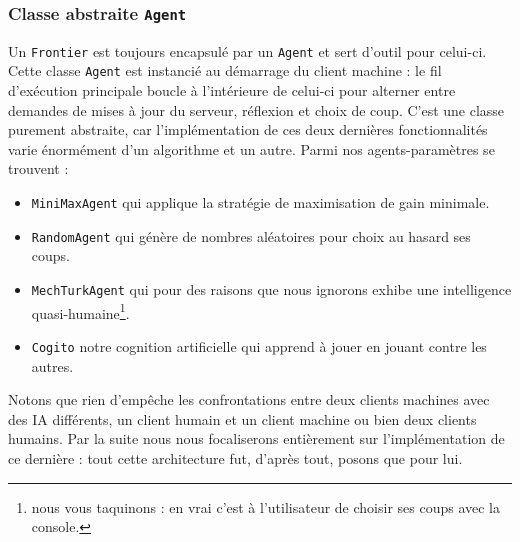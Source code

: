 \subsubsection{Classe abstraite \texttt{Agent}}
Un \texttt{Frontier} est toujours encapsulé par un \texttt{Agent} et sert d'outil pour celui-ci. Cette classe \texttt{Agent} est instancié au démarrage du client machine : le fil d'exécution principale boucle à l'intérieure de celui-ci pour alterner entre demandes de mises à jour du serveur, réflexion et choix de coup. C'est une classe purement abstraite, car l'implémentation de ces deux dernières fonctionnalités varie énormément d'un algorithme et un autre. Parmi nos agents-paramètres se trouvent :
\begin{itemize}
\item \texttt{MiniMaxAgent} qui applique la stratégie de maximisation de gain minimale. 
\item \texttt{RandomAgent} qui génère de nombres aléatoires pour choix au hasard ses coups.
\item \texttt{MechTurkAgent} qui pour des raisons que nous ignorons exhibe une intelligence quasi-humaine\footnote{nous vous taquinons : en vrai c'est à l'utilisateur de choisir ses coups avec la console. }.
\item \texttt{Cogito} notre cognition artificielle qui apprend à jouer en jouant contre les autres.
\end{itemize}
Notons que rien d'empêche les confrontations entre deux clients machines avec des IA différents, un client humain et un client machine ou bien deux clients humains. Par la suite nous nous focaliserons entièrement sur l'implémentation de ce dernière : tout cette architecture fut, d'après tout, posons que pour lui.